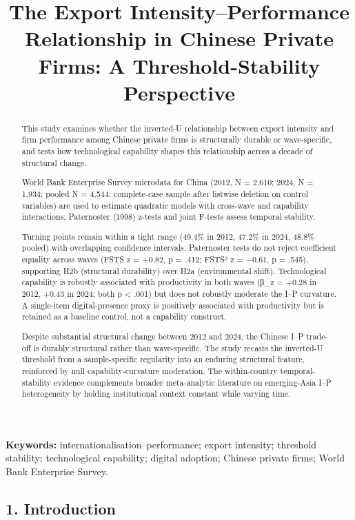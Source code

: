 \documentclass[
  12pt,a4paper]{article}
\title{The Export Intensity--Performance Relationship in Chinese Private
Firms: A Threshold-Stability Perspective}
\author{}
\date{}
\begin{document}
\maketitle
\begin{abstract}
This study examines whether the inverted-U relationship between export
intensity and firm performance among Chinese private firms is
structurally durable or wave-specific, and tests how technological
capability shapes this relationship across a decade of structural
change.

World Bank Enterprise Survey microdata for China (2012, N = 2,610; 2024,
N = 1,934; pooled N = 4,544; complete-case sample after listwise
deletion on control variables) are used to estimate quadratic models
with cross-wave and capability interactions; Paternoster (1998) z-tests
and joint F-tests assess temporal stability.

Turning points remain within a tight range (49.4\% in 2012, 47.2\% in
2024, 48.8\% pooled) with overlapping confidence intervals. Paternoster
tests do not reject coefficient equality across waves (FSTS z = +0.82, p
= .412; FSTS² z = −0.61, p = .545), supporting H2b (structural
durability) over H2a (environmental shift). Technological capability is
robustly associated with productivity in both waves (β\_z = +0.28 in
2012, +0.43 in 2024; both p \textless{} .001) but does not robustly
moderate the I--P curvature. A single-item digital-presence proxy is
positively associated with productivity but is retained as a baseline
control, not a capability construct.

Despite substantial structural change between 2012 and 2024, the Chinese
I--P trade-off is durably structural rather than wave-specific. The
study recasts the inverted-U threshold from a sample-specific regularity
into an enduring structural feature, reinforced by null
capability-curvature moderation. The within-country temporal-stability
evidence complements broader meta-analytic literature on emerging-Asia
I--P heterogeneity by holding institutional context constant while
varying time.
\end{abstract}

\textbf{Keywords:} internationalisation--performance; export intensity;
threshold stability; technological capability; digital adoption; Chinese
private firms; World Bank Enterprise Survey.

\hypertarget{introduction}{%
\subsection{1. Introduction}\label{introduction}}
\end{document}
